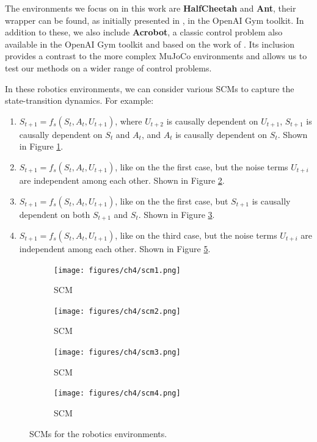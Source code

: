 The environments we focus on in this work are
\textbf{HalfCheetah} and \textbf{Ant},
their wrapper can be found, as initially
presented in \cite{brockman2016openaigym},
in the OpenAI Gym toolkit.
In addition to these, we also include \textbf{Acrobot},
a classic control problem also available in the OpenAI Gym
toolkit and based on the work of \cite{sutton1998}.
Its inclusion provides
a contrast to the more complex MuJoCo environments and
allows us to test our methods on a wider range of
control problems.

In these robotics environments, we can consider
various SCMs
to capture the state-transition dynamics. For example:
\begin{enumerate}
    \item $S_{t+1} = f_s(S_t, A_t, U_{t+1})$, where $U_{t+2}$
    is causally dependent on $U_{t+1}$, 
    $S_{t+1}$ is causally dependent on $S_t$ and $A_t$, and
    $A_t$ is causally dependent on $S_t$. Shown in Figure \ref{fig:scm1}.
    \item $S_{t+1} = f_s(S_t, A_t, U_{t+1})$, like on the
    the first case, but the noise terms $U_{t+i}$ are independent
    among each other. Shown in Figure \ref{fig:scm2}.
    \item $S_{t+1} = f_s(S_t, A_t, U_{t+1})$, like on the
    the first case, but $S_{t+1}$ is causally dependent on both $S_{t+1}$
    and $S_t$. Shown in Figure \ref{fig:scm3}.
    \item $S_{t+1} = f_s(S_t, A_t, U_{t+1})$, like on the
    third case, but the noise terms $U_{t+i}$ are independent
    among each other. Shown in Figure \ref{fig:scm4}.
\end{enumerate}
\begin{figure}
    \begin{subfigure}[t]{.4\textwidth}
        \centering
        \texttt{[image: figures/ch4/scm1.png]}
        \caption{ SCM}
        \label{fig:scm1}
    \end{subfigure}
    \hfill
    \begin{subfigure}[t]{.4\textwidth}
        \centering
        \texttt{[image: figures/ch4/scm2.png]}
        \caption{ SCM}
        \label{fig:scm2}
    \end{subfigure}
    \medskip
    \begin{subfigure}[t]{.4\textwidth}
        \centering
        \texttt{[image: figures/ch4/scm3.png]}
        \caption{ SCM}
        \label{fig:scm3}
    \end{subfigure}
    \hfill
    \begin{subfigure}[t]{.4\textwidth}
        \centering
        \texttt{[image: figures/ch4/scm4.png]}
        \caption{ SCM}
        \label{fig:scm4}
    \end{subfigure}
    \caption{SCMs for the robotics environments.}
\end{figure}
